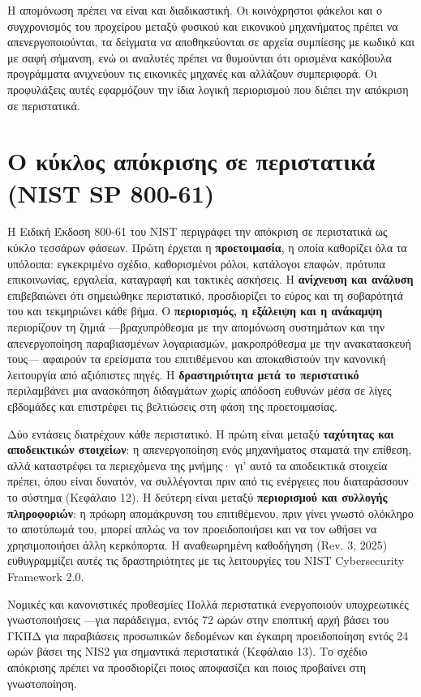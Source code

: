 Η απομόνωση πρέπει να είναι και διαδικαστική. Οι κοινόχρηστοι φάκελοι και ο συγχρονισμός του προχείρου μεταξύ φυσικού και εικονικού μηχανήματος πρέπει να απενεργοποιούνται, τα δείγματα να αποθηκεύονται σε αρχεία συμπίεσης με κωδικό και με σαφή σήμανση, ενώ οι αναλυτές πρέπει να θυμούνται ότι ορισμένα κακόβουλα προγράμματα ανιχνεύουν τις εικονικές μηχανές και αλλάζουν συμπεριφορά. Οι προφυλάξεις αυτές εφαρμόζουν την ίδια λογική περιορισμού που διέπει την απόκριση σε περιστατικά.

\section{Ο κύκλος απόκρισης σε περιστατικά (NIST SP 800-61)}\label{sec:11.6}
Η Ειδική Έκδοση 800-61 του NIST περιγράφει την απόκριση σε περιστατικά ως κύκλο τεσσάρων φάσεων. Πρώτη έρχεται η \textbf{προετοιμασία}, η οποία καθορίζει όλα τα υπόλοιπα: εγκεκριμένο σχέδιο, καθορισμένοι ρόλοι, κατάλογοι επαφών, πρότυπα επικοινωνίας, εργαλεία, καταγραφή και τακτικές ασκήσεις. Η \textbf{ανίχνευση και ανάλυση} επιβεβαιώνει ότι σημειώθηκε περιστατικό, προσδιορίζει το εύρος και τη σοβαρότητά του και τεκμηριώνει κάθε βήμα. Ο \textbf{περιορισμός, η εξάλειψη και η ανάκαμψη} περιορίζουν τη ζημιά —βραχυπρόθεσμα με την απομόνωση συστημάτων και την απενεργοποίηση παραβιασμένων λογαριασμών, μακροπρόθεσμα με την ανακατασκευή τους— αφαιρούν τα ερείσματα του επιτιθέμενου και αποκαθιστούν την κανονική λειτουργία από αξιόπιστες πηγές. Η \textbf{δραστηριότητα μετά το περιστατικό} περιλαμβάνει μια ανασκόπηση διδαγμάτων χωρίς απόδοση ευθυνών μέσα σε λίγες εβδομάδες και επιστρέφει τις βελτιώσεις στη φάση της προετοιμασίας.

Δύο εντάσεις διατρέχουν κάθε περιστατικό. Η πρώτη είναι μεταξύ \textbf{ταχύτητας και αποδεικτικών στοιχείων}: η απενεργοποίηση ενός μηχανήματος σταματά την επίθεση, αλλά καταστρέφει τα περιεχόμενα της μνήμης· γι' αυτό τα αποδεικτικά στοιχεία πρέπει, όπου είναι δυνατόν, να συλλέγονται πριν από τις ενέργειες που διαταράσσουν το σύστημα (Κεφάλαιο 12). Η δεύτερη είναι μεταξύ \textbf{περιορισμού και συλλογής πληροφοριών}: η πρόωρη απομάκρυνση του επιτιθέμενου, πριν γίνει γνωστό ολόκληρο το αποτύπωμά του, μπορεί απλώς να τον προειδοποιήσει και να τον ωθήσει να χρησιμοποιήσει άλλη κερκόπορτα. Η αναθεωρημένη καθοδήγηση (Rev. 3, 2025) ευθυγραμμίζει αυτές τις δραστηριότητες με τις λειτουργίες του NIST Cybersecurity Framework 2.0.

\begin{notebox}{Νομικές και κανονιστικές προθεσμίες}
Πολλά περιστατικά ενεργοποιούν υποχρεωτικές γνωστοποιήσεις —για παράδειγμα, εντός 72 ωρών στην εποπτική αρχή βάσει του ΓΚΠΔ για παραβιάσεις προσωπικών δεδομένων και έγκαιρη προειδοποίηση εντός 24 ωρών βάσει της NIS2 για σημαντικά περιστατικά (Κεφάλαιο 13). Το σχέδιο απόκρισης πρέπει να προσδιορίζει ποιος αποφασίζει και ποιος προβαίνει στη γνωστοποίηση.
\end{notebox}

